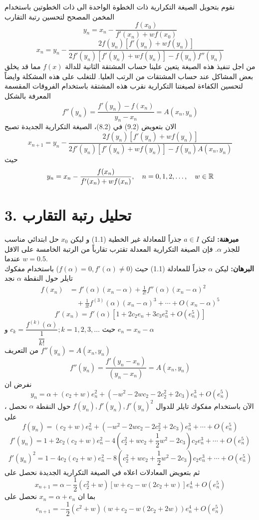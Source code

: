 نقوم بتحويل الصيغة التكرارية ذات الخطوة الواحدة الى ذات الخطوتين باستخدام المخمن المصحح لتحسين رتبة التقارب
\[
y_n = x_n - \frac{f(x_0)}{f'(x_n)+wf(x_0)}
\]
\begin{equation}
x_{n} = y_n - \frac{2f(y_n)[f'(y_n)+wf(y_n)]}{2f'(y_n)[f'(y_n)+wf(y_n)] - f(y_n)f''(y_n)} 
\end{equation}
من اجل تنفيذ هذه الصيغة يتعين علينا حساب المشتقة الثانية للدالة $f(x)$ مما قد يخلق بعض المشاكل عند حساب المشتقات من الرتب العليا. للتغلب على هذه المشكلة وايضاً لتحسين الكفاءة لصيغتنا التكرارية نقرب هذه المشتقة باستخدام الفروقات المقسمة المعرفة بالشكل
\begin{equation}
f''(y_n) = \frac{f'(y_n) - f(x_n)}{y_n - x_n} = A(x_n, y_n)
\end{equation}
الان بتعويض (9.2) في (8.2)، الصيغة التكرارية الجديدة تصبح
\begin{equation}
x_{n+1} = y_n - \frac{2f(y_n)[f'(y_n)+wf(y_n)]}{2f'(y_n) [f'(y_n) + wf(y_n)] -f(y_n)A(x_n, y_n)} 
\end{equation}
حيث
\begin{equation}
	y_n = x_n - \frac{f(x_n)}{f'(x_n) + wf(x_n)}, \quad n=0,1,2,\dots, \quad w\in\mathbb{R}
\end{equation}

\section*{3. تحليل رتبة التقارب}
\textbf{مبرهنة:} لتكن $a\in I$ جذراً للمعادلة غير الخطية (1.1) و ليكن $x_0$ حل ابتدائي مناسب للجذر $\alpha$. فإن الصيغة التكرارية المعدلة تقترب تقارباً من الرتبة الخامسة على الاقل عندما $w=0.5$.\\
\textbf{البرهان:} ليكن $\alpha$ جذراً للمعادلة (1.1) حيث ($f(\alpha)=0, f'(\alpha)\neq 0$) باستخدام مفكوك تايلر حول النقطة $\alpha$ نجد
\begin{align*}
	f(x_n) &= f'(\alpha)(x_n-\alpha) + \frac{1}{2!} f''(\alpha)(x_n-\alpha)^2\\
	&\quad + \frac{1}{3!} f^{(3)}(\alpha) (x_n-\alpha)^3 + \cdots + O(x_n-\alpha)^5
\end{align*}
\[
f'(x_n) = f'(\alpha) [1 + 2c_2e_n + 3c_3 e_n^2 + O(e_n^5)]
\]
حيث 
$c_k = \dfrac{f^{(k)}(\alpha)}{\dfrac{1}{k!}}; k=1,2,3,\dots$
و $e_n = x_n-\alpha$\\[10pt]
من التعريف
$f''(y_n) = A(x_n, y_n)$
\[
f''(y_n) = \frac{f'(y_n - x_n)}{(y_n - x_n)} = A(x_n, y_n)
\]
نفرض ان 
\[
y_n = \alpha + (c_2+w)e_n^2 + (-w^2-2wc_2-2c_2^2+2c_3)e_n^3 + O(e_n^{5})
\]
  ، الآن باستخدام مفكوك تايلر للدوال $f(y_n), f'(y_n) , f'(y_n)^2 $ حول النقطة $\alpha$ نحصل على 
\[
f(y_n) = (c_2+w)e_n^2 +  (-w^2-2wc_2-2c_2^2+2c_3)e_n^3 + \cdots + O(e_n^5)
\]
\[
f'(y_n) = 1 + 2c_2 (c_2+w)e_n^2 - 4(c_2^2 + wc_2+\frac{1}{2}w^2 - 2c_3)c_2e_n^3+\cdots+O(e_n^5)
\]
\[
f'(y_n)^2 = 1-4c_2(c_2+w)e_n^2 - 8(c_2^2 + wc_2 + \frac{1}{2}w^2-2c_3)c_2e_n^3 + \cdots +O(e_n^5)
\]
ثم بتعويض المعادلات اعلاه في الصيغة التكرارية الجديدة نحصل على 
\[
x_{n+1} = \alpha - \frac{1}{2}(c_2^2 + w)[w+c_2-w(2c_2+w)]e_n^4  + O(e_n^5)
\]
بما ان $x_n = \alpha +e_n$ نحصل على 
\[
e_{n+1} = -\frac{1}{2}(c^2 + w)(w+c_2-w(2c_2+2w))e_n^4 + O(e_n^5)
\]